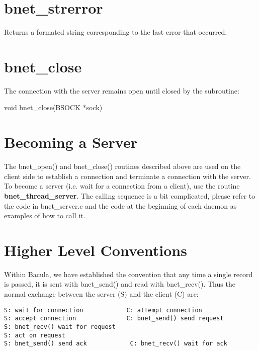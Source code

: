 \section{bnet\_strerror}

Returns a formated string corresponding to the last error that occurred.

\section{bnet\_close}

The connection with the server remains open until closed by the subroutine:

void bnet\_close(BSOCK *sock)

\section{Becoming a Server}

The bnet\_open() and bnet\_close() routines described above are used on the
client side to establish a connection and terminate a connection with the
server. To become a server (i.e. wait for a connection from a client), use the
routine {\bf bnet\_thread\_server}. The calling sequence is a bit complicated,
please refer to the code in bnet\_server.c and the code at the beginning of
each daemon as examples of how to call it.

\section{Higher Level Conventions}

Within Bacula, we have established the convention that any time a single
record is passed, it is sent with bnet\_send() and read with bnet\_recv().
Thus the normal exchange between the server (S) and the client (C) are:

\footnotesize
\begin{verbatim}
S: wait for connection            C: attempt connection
S: accept connection              C: bnet_send() send request
S: bnet_recv() wait for request
S: act on request
S: bnet_send() send ack            C: bnet_recv() wait for ack
\end{verbatim}
\normalsize

